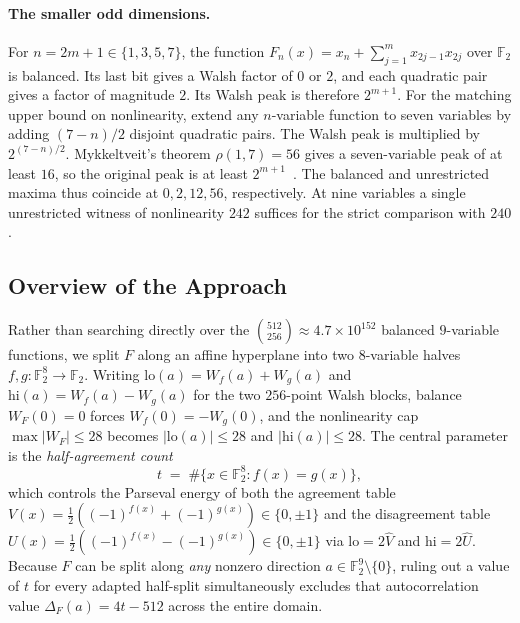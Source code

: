 \documentclass[11pt]{article}
\theoremstyle{definition}
\newcommand{\F}{\mathbb{F}}
\begin{document}
\paragraph{The smaller odd dimensions.}
For $n=2m+1\in\{1,3,5,7\}$, the function
$F_n(x)=x_n+\sum_{j=1}^{m}x_{2j-1}x_{2j}$ over $\F_2$ is balanced.
Its last bit gives a Walsh factor of $0$ or $2$, and each quadratic pair
gives a factor of magnitude $2$. Its Walsh peak is therefore $2^{m+1}$.
For the matching upper bound on nonlinearity, extend any $n$-variable
function to seven variables by adding $(7-n)/2$ disjoint quadratic pairs.
The Walsh peak is multiplied by $2^{(7-n)/2}$. Mykkeltveit's theorem
$\rho(1,7)=56$ gives a seven-variable peak of at least $16$,
so the original peak is at least $2^{m+1}$~\cite{Mykkeltveit1980}.
The balanced and unrestricted maxima thus coincide at $0,2,12,56$,
respectively. At nine variables a single unrestricted witness of
nonlinearity $242$ suffices for the strict comparison with $240$.

\subsection{Overview of the Approach}
Rather than searching directly over the $\binom{512}{256} \approx 4.7 \times 10^{152}$ balanced $9$-variable functions, we split $F$ along an affine hyperplane into two $8$-variable halves $f, g : \F_2^8 \to \F_2$.
Writing $\mathrm{lo}(a) = W_f(a) + W_g(a)$ and $\mathrm{hi}(a) = W_f(a) - W_g(a)$ for the two $256$-point Walsh blocks, balance $W_F(0) = 0$ forces $W_f(0) = -W_g(0)$, and the nonlinearity cap $\max |W_F| \le 28$ becomes $|\mathrm{lo}(a)| \le 28$ and $|\mathrm{hi}(a)| \le 28$.
The central parameter is the \emph{half-agreement count}
\[
  t \;=\; \#\{x \in \F_2^8 : f(x) = g(x)\},
\]
which controls the Parseval energy of both the agreement table $V(x) = \frac{1}{2}((-1)^{f(x)} + (-1)^{g(x)}) \in \{0, \pm 1\}$ and the disagreement table $U(x) = \frac{1}{2}((-1)^{f(x)} - (-1)^{g(x)}) \in \{0, \pm 1\}$ via $\mathrm{lo} = 2\widehat{V}$ and $\mathrm{hi} = 2\widehat{U}$.
Because $F$ can be split along \emph{any} nonzero direction $a \in \F_2^9 \setminus \{0\}$, ruling out a value of $t$ for every adapted half-split simultaneously excludes that autocorrelation value $\Delta_F(a) = 4t - 512$ across the entire domain.
\end{document}
